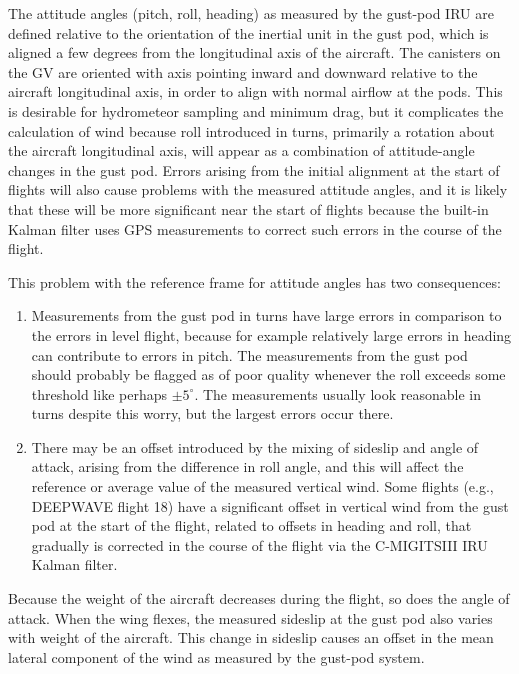 \documentclass[12pt,twoside,english]{article}\usepackage[]{graphicx}\usepackage[]{color}
\let\OrgIndex\index
\renewcommand*{\index}[1]{\OrgIndex{#1}}
\begin{document}

The attitude angles (pitch, roll,  heading) as measured by the gust-pod IRU are defined relative to the orientation of the inertial unit in the gust pod, which is aligned a few degrees from the longitudinal axis of the aircraft. The canisters on the GV are oriented with axis pointing inward and downward relative to the aircraft longitudinal axis, in order to align with normal airflow at the pods. This is desirable for hydrometeor sampling and minimum drag, but it complicates the calculation of wind because roll introduced in turns, primarily a rotation about the aircraft longitudinal axis, will appear as a combination of attitude-angle changes in the gust pod. Errors arising from the initial alignment at the start of flights will also cause problems with the measured attitude angles, and it is likely that these will be more significant near the start of flights because the built-in Kalman filter uses GPS measurements to correct such errors in the course of the flight. 

This problem with the reference frame for attitude angles has two consequences:  
\begin{enumerate}
\item Measurements from the gust pod in turns have large errors in comparison to the errors in level flight, because for example relatively large errors in heading can contribute to errors in pitch. The measurements from the gust pod should probably be flagged as of poor quality whenever the roll exceeds some threshold like perhaps $\pm5^{\circ}$. The measurements usually look reasonable in turns despite this worry, but the largest errors occur there.  
\item There may be an offset introduced by the mixing of sideslip and angle of attack, arising from the difference in roll angle, and this will affect the reference or average value of the measured vertical wind. Some flights (e.g., DEEPWAVE flight 18) have a significant offset in vertical wind from the gust pod at the start of the flight, related to offsets in heading and roll, that gradually is corrected in the course of the flight via the C-MIGITSIII IRU Kalman filter.  
\end{enumerate}
Because the weight of the aircraft decreases during the flight, so does the angle of attack. When the wing flexes, the measured sideslip at the gust pod also varies with weight of the aircraft. This change in sideslip causes an offset in the mean lateral component of the wind as measured by the gust-pod system. 
\end{document}

